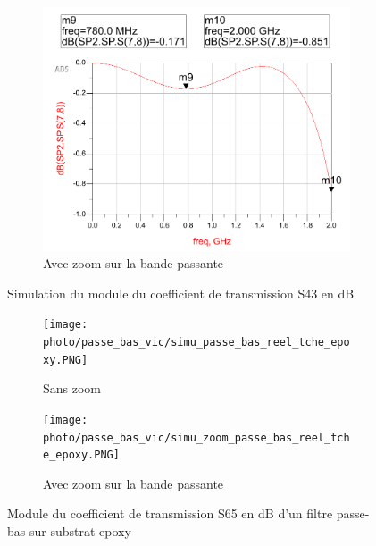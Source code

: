 \documentclass[french]{article}
\begin{document}
\begin{figure}[H]
\begin{subfigure}[b]{0.49\textwidth}
		\includegraphics[width=\textwidth]{photo/passe_bas_vic/simu_zoom_passe_bas_distribue_ameliore.PNG}
		\caption{Avec zoom sur la bande passante}
		\label{fig:simu_zoom_passe_bas_distribue_ameliore}
	\end{subfigure}
	\caption{Simulation du module du coefficient de transmission S43 en dB}
\end{figure}





\begin{figure}[H]
	\centering
	\begin{subfigure}[b]{0.49\textwidth}
		\texttt{[image: photo/passe\_bas\_vic/simu\_passe\_bas\_reel\_tche\_epoxy.PNG]}
		\caption{Sans zoom}
		\label{fig:simu_passe_bas_reel_tche_epoxy}
	\end{subfigure}
	\begin{subfigure}[b]{0.49\textwidth}
		\texttt{[image: photo/passe\_bas\_vic/simu\_zoom\_passe\_bas\_reel\_tche\_epoxy.PNG]}
		\caption{Avec zoom sur la bande passante}
		\label{fig:simu_zoom_passe_bas_distribue_ameliore}
	\end{subfigure}
	\caption{Module du coefficient de transmission S65 en dB d'un filtre passe-bas sur substrat epoxy}
\end{figure}
\end{document}
